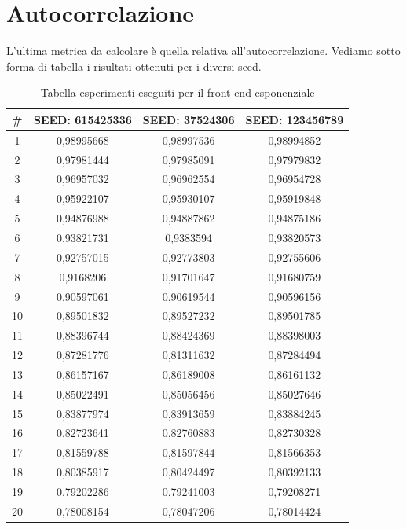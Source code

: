 \section{Autocorrelazione}
L'ultima metrica da calcolare è quella relativa all'autocorrelazione. Vediamo sotto forma di tabella i risultati ottenuti per i diversi seed.
\begin{table}[H]
 \centering
 \begin{tabular}{|c|c|c|c|}
 \hline
 \# & SEED: 615425336 & SEED: 37524306 & SEED: 123456789 \\ \hline
 1 & 0,98995668 & 0,98997536 & 0,98994852 \\ \hline
 2 & 0,97981444 & 0,97985091 & 0,97979832 \\ \hline
 3 & 0,96957032 & 0,96962554 & 0,96954728 \\ \hline
 4 & 0,95922107 & 0,95930107 & 0,95919848 \\ \hline
 5 & 0,94876988 & 0,94887862 & 0,94875186 \\ \hline
 6 & 0,93821731 & 0,9383594 & 0,93820573 \\ \hline
 7 & 0,92757015 & 0,92773803 & 0,92755606 \\ \hline
 8 & 0,9168206 & 0,91701647 & 0,91680759 \\ \hline
 9 & 0,90597061 & 0,90619544 & 0,90596156 \\ \hline
 10 & 0,89501832 & 0,89527232 & 0,89501785 \\ \hline
 11 & 0,88396744 & 0,88424369 & 0,88398003 \\ \hline
 12 & 0,87281776 & 0,81311632 & 0,87284494 \\ \hline
 13 & 0,86157167 & 0,86189008 & 0,86161132 \\ \hline
 14 & 0,85022491 & 0,85056456 & 0,85027646 \\ \hline
 15 & 0,83877974 & 0,83913659 & 0,83884245 \\ \hline
 16 & 0,82723641 & 0,82760883 & 0,82730328 \\ \hline
 17 & 0,81559788 & 0,81597844 & 0,81566353 \\ \hline
 18 & 0,80385917 & 0,80424497 & 0,80392133 \\ \hline
 19 & 0,79202286 & 0,79241003 & 0,79208271 \\ \hline
 20 & 0,78008154 & 0,78047206 & 0,78014424 \\ \hline
 \end{tabular}
 \caption{Tabella esperimenti eseguiti per il front-end esponenziale}
 \end{table}
 

